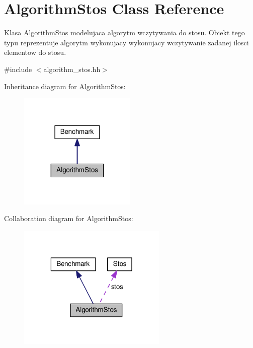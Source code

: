 \hypertarget{class_algorithm_stos}{\section{Algorithm\-Stos Class Reference}
\label{class_algorithm_stos}
}


Klasa \hyperlink{class_algorithm_stos}{Algorithm\-Stos} modelujaca algorytm wczytywania do stosu. Obiekt tego typu reprezentuje algorytm wykonujacy wykonujacy wczytywanie zadanej ilosci elementow do stosu.  




{\ttfamily \#include $<$algorithm\-\_\-stos.\-hh$>$}



Inheritance diagram for Algorithm\-Stos\-:\nopagebreak
\begin{figure}[H]
\begin{center}
\leavevmode
\includegraphics[width=158pt]{class_algorithm_stos__inherit__graph}
\end{center}
\end{figure}


Collaboration diagram for Algorithm\-Stos\-:\nopagebreak
\begin{figure}[H]
\begin{center}
\leavevmode
\includegraphics[width=201pt]{class_algorithm_stos__coll__graph}
\end{center}
\end{figure}
